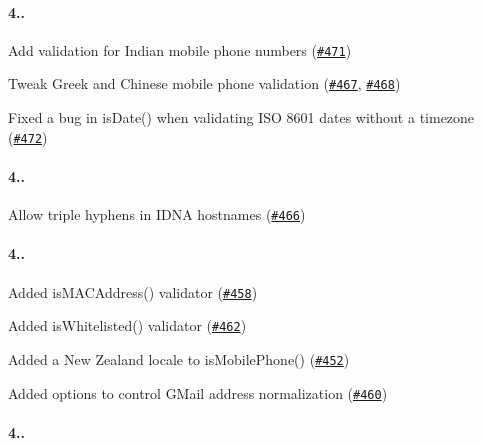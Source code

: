 \paragraph*{4..}


\begin{DoxyItemize}
\item Add validation for Indian mobile phone numbers (\href{https://github.com/chriso/validator.js/pull/471}{\tt \#471})
\item Tweak Greek and Chinese mobile phone validation (\href{https://github.com/chriso/validator.js/pull/467}{\tt \#467}, \href{https://github.com/chriso/validator.js/pull/468}{\tt \#468})
\item Fixed a bug in {\ttfamily is\+Date()} when validating I\+SO 8601 dates without a timezone (\href{https://github.com/chriso/validator.js/issues/472}{\tt \#472})
\end{DoxyItemize}

\paragraph*{4..}


\begin{DoxyItemize}
\item Allow triple hyphens in I\+D\+NA hostnames (\href{https://github.com/chriso/validator.js/issues/466}{\tt \#466})
\end{DoxyItemize}

\paragraph*{4..}


\begin{DoxyItemize}
\item Added {\ttfamily is\+M\+A\+C\+Address()} validator (\href{https://github.com/chriso/validator.js/pull/458}{\tt \#458})
\item Added {\ttfamily is\+Whitelisted()} validator (\href{https://github.com/chriso/validator.js/pull/462}{\tt \#462})
\item Added a New Zealand locale to {\ttfamily is\+Mobile\+Phone()} (\href{https://github.com/chriso/validator.js/pull/452}{\tt \#452})
\item Added options to control G\+Mail address normalization (\href{https://github.com/chriso/validator.js/pull/460}{\tt \#460})
\end{DoxyItemize}

\paragraph*{4..}


